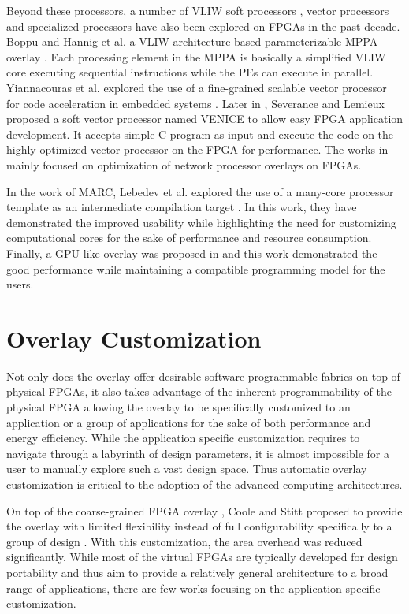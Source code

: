 Beyond these processors, a number of VLIW soft processors \cite{anjam2010vliw,hannig2014invasive, boppu2014compact}, vector processors \cite{yiannacouras2009fine, guy2012VENICE} and specialized processors \cite{buciak2007lightweight, liu2004fpga} have also been explored on FPGAs in the past decade. Boppu and Hannig et al. a VLIW architecture based parameterizable MPPA overlay \cite{hannig2014invasive, boppu2014compact}. Each processing element in the MPPA is basically a simplified VLIW core executing sequential instructions while the PEs can execute in parallel. Yiannacouras et al. explored the use of a fine-grained scalable vector processor for code acceleration in embedded systems \cite{yiannacouras2009fine}. Later in \cite{guy2012VENICE}, Severance and Lemieux proposed a soft vector processor named VENICE to allow easy FPGA application development. It accepts simple C program as input and execute the code on the highly optimized vector processor on the FPGA for performance. The works in \cite{buciak2007lightweight, liu2004fpga} mainly focused on optimization of network processor overlays on FPGAs.  

In the work of MARC, Lebedev et al. explored the use of a many-core processor template as an intermediate compilation target \cite{lebedev2010MARC}. In this work, they have demonstrated the improved usability while highlighting the need for customizing computational cores for the sake of performance and resource consumption. Finally, a GPU-like overlay was proposed in \cite{jeffrey2011potential} and this work demonstrated the good performance while maintaining a compatible programming model for the users.

\section{Overlay Customization}
Not only does the overlay offer desirable software-programmable fabrics on top of physical FPGAs, it also takes advantage of the inherent programmability of the physical FPGA allowing the overlay to be specifically customized to an application or a group of applications for the sake of both performance and energy efficiency. While the application specific customization requires to navigate through a labyrinth of design parameters, it is almost impossible for a user to manually explore such a vast design space. Thus automatic overlay customization is critical to the adoption of the advanced computing architectures. 

On top of the coarse-grained FPGA overlay \cite{coole2010intermediate}, Coole and Stitt proposed to provide the overlay with limited flexibility instead of full configurability specifically to a group of design \cite{coole2015adjustable}. With this customization, the area overhead was reduced significantly. While most of the virtual FPGAs are typically developed for design portability and thus aim to provide a relatively general architecture to a broad range of applications, there are few works focusing on the application specific customization. 

